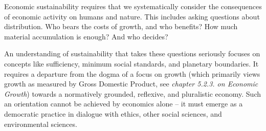 \documentclass[
  a4paper,
  openany]{book}
\begin{document}
Economic sustainability requires that we systematically consider the
consequences of economic activity on humans and nature. This includes
asking questions about distribution. Who bears the costs of growth, and
who benefits? How much material accumulation is enough? And who decides?

An understanding of sustainability that takes these questions seriously
focuses on concepts like sufficiency, minimum social standards, and
planetary boundaries. It requires a departure from the dogma of a focus
on growth (which primarily views growth as measured by Gross Domestic
Product, see \emph{chapter 5.2.3. on Economic Growth}) towards a
normatively grounded, reflexive, and pluralistic economy. Such an
orientation cannot be achieved by economics alone -- it must emerge as a
democratic practice in dialogue with ethics, other social sciences, and
environmental sciences.
\end{document}
